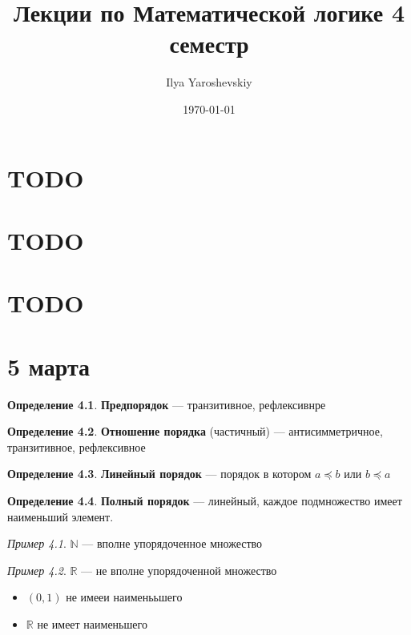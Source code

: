 \documentclass[oneside]{book}
\author{Ilya Yaroshevskiy}
\date{\today}
\title{Лекции по Математической логике 4 семестр}
\newcommand{\R}{\mathbb{R}}
\newcommand{\N}{\mathbb{N}}
\newcommand{\A}{\mathfrak{A}}
\newcommand{\B}{\mathfrak{B}}
\theoremstyle{plain}
\theoremstyle{remark}
\newtheorem*{examp}{Пример}
\theoremstyle{definition}
\newtheorem*{definition}{Определение}
\begin{document}
\maketitle
\tableofcontents


\chapter{TODO}
\label{sec:org269b96c}
\chapter{TODO}
\label{sec:orge4880f3}
\chapter{TODO}
\label{sec:org30da29a}
\chapter{5 марта}
\label{sec:org53b908b}
\renewcommand{\P}{\mathcal{P}}
\newcommand{\A}{\mathcal{A}}
\newcommand{\L}{\mathcal{L}}
\newcommand{\B}{\mathcal{B}}


\begin{definition}
\textbf{Предпорядок} --- транзитивное, рефлексивнре
\end{definition}
\begin{definition}
\textbf{Отношение порядка} (частичный) --- антисимметричное, транзитивное, рефлексивное
\end{definition}
\begin{definition}
\textbf{Линейный порядок} --- порядок в котором \(a \preceq b\) или \(b \preceq a\)
\end{definition}
\begin{definition}
\textbf{Полный порядок} --- линейный, каждое подмножество имеет наименьший элемент. 
\end{definition}
\begin{examp}
\(\N\) --- вполне упорядоченное множество
\end{examp}
\begin{examp}
\(\R\) --- не вполне упорядоченной множество
\begin{itemize}
\item \((0, 1)\) не имееи наименььшего
\item \(\R\) не имеет наименьшего
\end{itemize}
\end{examp}
\end{document}

